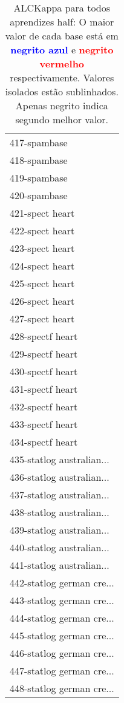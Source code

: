 \begin{table}[h]
\caption{ALCKappa para todos aprendizes half: O maior valor de cada base está em \textcolor{blue}{\textbf{negrito azul}} e \textcolor{red}{\textbf{negrito vermelho}} respectivamente. Valores isolados estão sublinhados. Apenas negrito indica segundo melhor valor.}
\begin{center}\begin{tabular}{l}
 & \\ \hline 417-spambase &  \\
418-spambase &  \\
419-spambase &  \\
420-spambase &  \\
421-spect heart &  \\
422-spect heart &  \\
423-spect heart &  \\ \hline
424-spect heart &  \\
425-spect heart &  \\
426-spect heart &  \\
427-spect heart &  \\
428-spectf heart &  \\
429-spectf heart &  \\
430-spectf heart &  \\ \hline
431-spectf heart &  \\
432-spectf heart &  \\
433-spectf heart &  \\
434-spectf heart &  \\
435-statlog australian... &  \\
436-statlog australian... &  \\
437-statlog australian... &  \\ \hline
438-statlog australian... &  \\
439-statlog australian... &  \\
440-statlog australian... &  \\
441-statlog australian... &  \\
442-statlog german cre... &  \\
443-statlog german cre... &  \\
444-statlog german cre... &  \\ \hline
445-statlog german cre... &  \\
446-statlog german cre... &  \\
447-statlog german cre... &  \\
448-statlog german cre... &  \\\end{tabular}\label{stratsALCKappa13AllReduxHalfb}
\end{center}
\end{table}
